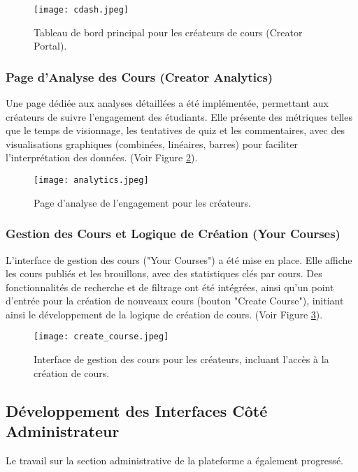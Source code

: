 \documentclass[12pt, a4paper]{article}
\begin{document}
\begin{figure}[htbp]
  \centering
  \texttt{[image: cdash.jpeg]} 
  \caption{Tableau de bord principal pour les créateurs de cours (Creator Portal).}
  \label{fig:creator_dashboard}
\end{figure}

\subsubsection{Page d'Analyse des Cours (Creator Analytics)}
Une page dédiée aux analyses détaillées a été implémentée, permettant aux créateurs de suivre l'engagement des étudiants. Elle présente des métriques telles que le temps de visionnage, les tentatives de quiz et les commentaires, avec des visualisations graphiques (combinées, linéaires, barres) pour faciliter l'interprétation des données. (Voir Figure \ref{fig:creator_analytics}).

\begin{figure}[htbp]
  \centering
  \texttt{[image: analytics.jpeg]} 
  \caption{Page d'analyse de l'engagement pour les créateurs.}
  \label{fig:creator_analytics}
\end{figure}

\subsubsection{Gestion des Cours et Logique de Création (Your Courses)}
L'interface de gestion des cours ("Your Courses") a été mise en place. Elle affiche les cours publiés et les brouillons, avec des statistiques clés par cours. Des fonctionnalités de recherche et de filtrage ont été intégrées, ainsi qu'un point d'entrée pour la création de nouveaux cours (bouton "Create Course"), initiant ainsi le développement de la logique de création de cours. (Voir Figure \ref{fig:creator_courses}).

\begin{figure}[htbp]
  \centering
  \texttt{[image: create\_course.jpeg]} 
  \caption{Interface de gestion des cours pour les créateurs, incluant l'accès à la création de cours.}
  \label{fig:creator_courses}
\end{figure}

\subsection{Développement des Interfaces Côté Administrateur}
Le travail sur la section administrative de la plateforme a également progressé.
\end{document}

